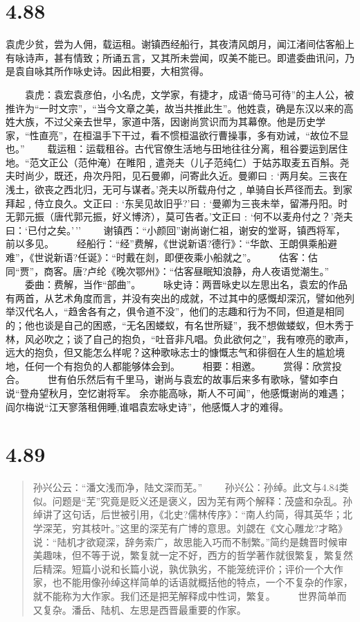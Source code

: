 \documentclass[]{book}
\begin{document}
\section{4.88}\label{section-265}

袁虎少贫，尝为人佣，载运租。谢镇西经船行，其夜清风朗月，闻江渚间估客船上有咏诗声，甚有情致；所诵五言，又其所未尝闻，叹美不能已。即遣委曲讯问，乃是袁自咏其所作咏史诗。因此相要，大相赏得。

　　袁虎：袁宏袁彦伯，小名虎，文学家，有捷才，成语``倚马可待''的主人公，被推许为``一时文宗''，``当今文章之美，故当共推此生''。他姓袁，确是东汉以来的高姓大族，不过父亲去世早，家道中落，因谢尚赏识而为其幕僚。他是历史学家，``性直亮''，在桓温手下干过，看不惯桓温欲行曹操事，多有劝诫，``故位不显也。''
　　载运租：运载租谷。古代官僚生活地与田地往往分离，租谷要运到居住地。``范文正公（范仲淹）在睢阳﹐遣尧夫（儿子范纯仁）于姑苏取麦五百斛。尧夫时尚少，既还，舟次丹阳，见石曼卿，问寄此久近。曼卿曰﹕`两月矣。三丧在浅土，欲丧之西北归，无可与谋者。'尧夫以所载舟付之﹐单骑自长芦径而去。到家拜起﹐侍立良久。文正曰﹕`东吴见故旧乎?'曰﹕`曼卿为三丧未举，留滞丹阳。时无郭元振（唐代郭元振，好义博济），莫可告者。'文正曰﹕`何不以麦舟付之？'尧夫曰：`已付之矣。'\,''
　　谢镇西：``小颜回''谢尚谢仁祖，谢安的堂哥，镇西将军，前以多见。
　　经船行：``经''费解，《世说新语?德行》：``华歆、王朗俱乘船避难''，《世说新语?任诞》：``时戴在剡，即便夜乘小船就之''。
　　估客：估同``贾''，商客。唐?卢纶《晚次鄂州》：``估客昼眠知浪静，舟人夜语觉潮生。''
　　委曲：费解，当作``部曲''。
　　咏史诗：两晋咏史以左思出名，袁宏的作品有两首，从艺术角度而言，并没有突出的成就，不过其中的感慨却深沉，譬如他列举汉代名人，``趋舍各有之，俱令道不没''，他们的志趣和行为不同，但道是相同的；他也谈是自己的困惑，``无名困蝼蚁，有名世所疑''，我不想做蝼蚁，但木秀于林，风必吹之；谈了自己的抱负，``吐音非凡唱。负此欲何之''，我有嘹亮的歌声，远大的抱负，但又能怎么样呢？这种歌咏志士的慷慨志气和徘徊在人生的尴尬境地，任何一个有抱负的人都能够体会到。
　　相要：相邀。 　　赏得：欣赏投合。
　　世有伯乐然后有千里马，谢尚与袁宏的故事后来多有歌咏，譬如李白说``登舟望秋月，空忆谢将军。
余亦能高咏，斯人不可闻''，他感慨谢尚的难遇；阎尔梅说``江天寥落租佣睡,谁唱袁宏咏史诗''，他感慨人才的难得。

\section{4.89}\label{section-266}

\begin{quote}
孙兴公云：``潘文浅而净，陆文深而芜。''
　　孙兴公：孙绰。此文与4.84类似。问题是``芜''究竟是贬义还是褒义，因为芜有两个解释：茂盛和杂乱。孙绰讲了这句话，后世被引用，《北史?儒林传序》：``南人约简，得其英华；北学深芜，穷其枝叶。''这里的深芜有广博的意思。刘勰在《文心雕龙?才略》说：``陆机才欲窥深，辞务索广，故思能入巧而不制繁。''简约是魏晋时候审美趣味，但不等于说，繁复就一定不好，西方的哲学著作就很繁复，繁复然后精深。短篇小说和长篇小说，孰优孰劣，不能笼统评价；评价一个大作家，也不能用像孙绰这样简单的话语就概括他的特点，一个不复杂的作家，就不能称为大作家。我们还是把芜解释成中性词，繁复。
　　世界简单而又复杂。潘岳、陆机、左思是西晋最重要的作家。
\end{quote}
\end{document}
